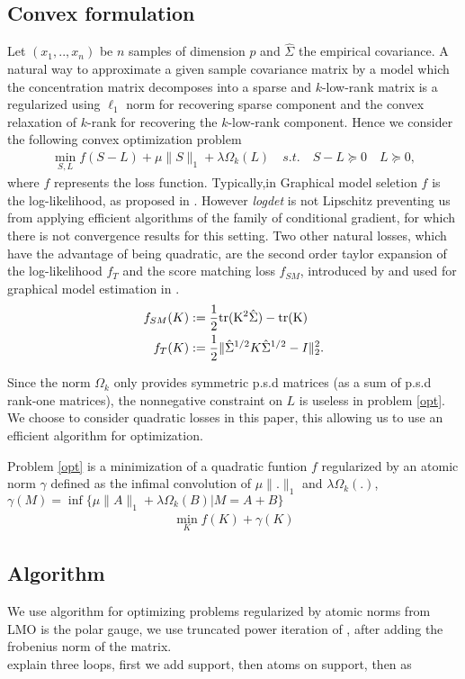 \subsection{Convex formulation}
Let $(x_1,..,x_n)$ be $n$ samples of dimension $p$ and   $\hat{\Sigma}$ the empirical covariance. A natural way to approximate a given sample covariance matrix by a model which the concentration matrix decomposes into a sparse and $k$-low-rank matrix is a regularized using $\ell_1$ norm for recovering sparse component and the convex relaxation of $k$-rank for recovering the $k$-low-rank component. Hence we consider the following convex optimization problem
\begin{align}
\label{opt}
\min_{S,L} f(S-L)+\mu\|S\|_{1}+\lambda\Omega_k(L) \quad s.t. \quad S-L \succeq 0 \quad L \succeq 0,
\end{align}
where  $f$ represents the loss function. Typically,in Graphical model seletion $f$ is the log-likelihood, as proposed in \citet{chandrasekaran2010}. However \textit{logdet} is not Lipschitz preventing us from applying efficient algorithms of the family of conditional gradient, for which there is not convergence results for this setting.  Two other natural losses, which have the advantage of being quadratic, are the second order taylor expansion of the log-likelihood $f_{T}$ and the score matching loss $f_{SM}$, introduced by \citet{hyvarinen2005estimation} and used for graphical model estimation in \citet{lin2016estimation}.
\begin{align}
f_{SM}(K)&:=\frac{1}{2}\rm tr(K^2 \hat{\Sigma})-\rm tr(K) \\
f_{T}(K)&:=\frac{1}{2}\|\hat{\Sigma}^{1/2}K\hat{\Sigma}^{1/2}-I\|_2^2.
\end{align}

Since the norm $\Omega_k$ only provides symmetric p.s.d matrices (as a sum of p.s.d rank-one matrices), the nonnegative constraint on $L$ is useless in problem \ref{opt}. 
We choose to consider quadratic losses in this paper, this allowing us to use an efficient algorithm for optimization.

Problem \ref{opt} is a minimization of a quadratic funtion $f$ regularized by an atomic norm $\gamma$  defined as the infimal convolution of $\mu\|.\|_{1}$ and $\lambda\Omega_k(.)$, $\gamma(M)=\inf\{\mu\|A\|_{1}+\lambda\Omega_k(B)|M=A+B\}$
\begin{align}
\label{opt_quad}
\min_{K} f(K)+ \gamma(K)
\end{align}


\subsection{Algorithm}
We use algorithm for optimizing problems regularized by atomic norms from \citet{vinyes2017}
LMO is the polar gauge,  we use truncated power iteration of \citet{yuan2013truncated}, after adding the frobenius norm of the matrix.\\

explain three loops, first we add support, then atoms on support, then as 





